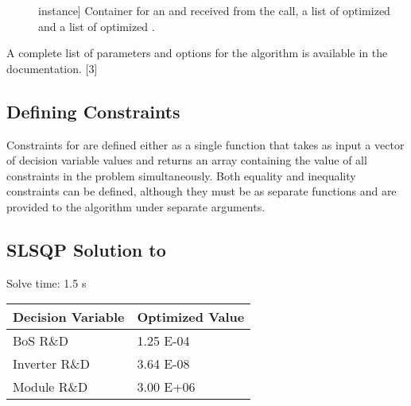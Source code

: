 \documentclass[letterpaper,10pt,english]{sphinxmanual}
\begin{document}
\begin{description}
\item[{}] \leavevmode{[} instance{]}
Container for an  and  received from the
 call, a list of optimized  and
a list of optimized .

\end{description}

A complete list of parameters and options for the 
algorithm is available in the documentation. {[}3{]}


\subsection{Defining Constraints}
\label{\detokenize{doc-src/optimizers:defining-constraints}}
Constraints for  are defined either as a single function
that takes as input a vector of decision variable values and returns an
array containing the value of all constraints in the problem
simultaneously. Both equality and inequality constraints can be defined,
although they must be as separate functions and are provided to the
 algorithm under separate arguments.


\subsection{SLSQP Solution to }
\label{\detokenize{doc-src/optimizers:slsqp-solution-to-pv-residential-simple}}
Solve time: 1.5 s


\begin{savenotes}\sphinxattablestart
\centering
\begin{tabulary}{\linewidth}[t]{|T|T|}
\hline
\sphinxstyletheadfamily 
Decision Variable
&\sphinxstyletheadfamily 
Optimized Value
\\
\hline
BoS R\&D
&
1.25 E-04
\\
\hline
Inverter R\&D
&
3.64 E-08
\\
\hline
Module R\&D
&
3.00 E+06
\\
\hline
\end{tabulary}
\par
\sphinxattableend\end{savenotes}
\end{document}
